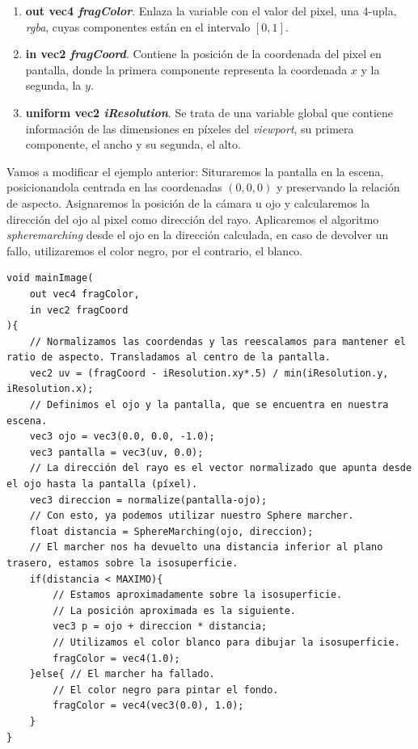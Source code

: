 \begin{enumerate}
    \item \textbf{out vec4 \textit{fragColor}}. Enlaza la variable con el valor del pixel, una 4-upla, \textit{rgba}, cuyas componentes están en el intervalo \([0,1]\).
    \item \textbf{in vec2 \textit{fragCoord}}. Contiene la posición de la coordenada del pixel en pantalla, donde la primera componente representa la coordenada \(x\) y la segunda, la \(y\).
    \item \textbf{uniform vec2 \textit{iResolution}}. Se trata de una variable global que contiene información de las dimensiones en píxeles del \textit{viewport}, su primera componente, el ancho y su segunda, el alto.
\end{enumerate}
Vamos a modificar el ejemplo anterior: Situraremos la pantalla en la escena, posicionandola centrada en las coordenadas \((0,0,0)\) y preservando la relación de aspecto.  Asignaremos la posición de la cámara u ojo y calcularemos la dirección del ojo al pixel como dirección del rayo. Aplicaremos el algoritmo \textit{spheremarching} desde el ojo en la dirección calculada, en caso de devolver un fallo, utilizaremos el color negro, por el contrario, el blanco.
\newpage
\begin{lstlisting}
void mainImage(
    out vec4 fragColor, 
    in vec2 fragCoord
){
    // Normalizamos las coordendas y las reescalamos para mantener el ratio de aspecto. Transladamos al centro de la pantalla.
    vec2 uv = (fragCoord - iResolution.xy*.5) / min(iResolution.y, iResolution.x);
    // Definimos el ojo y la pantalla, que se encuentra en nuestra escena.
    vec3 ojo = vec3(0.0, 0.0, -1.0);
    vec3 pantalla = vec3(uv, 0.0);
    // La dirección del rayo es el vector normalizado que apunta desde el ojo hasta la pantalla (píxel).
    vec3 direccion = normalize(pantalla-ojo);
    // Con esto, ya podemos utilizar nuestro Sphere marcher.
    float distancia = SphereMarching(ojo, direccion);
    // El marcher nos ha devuelto una distancia inferior al plano trasero, estamos sobre la isosuperficie.
    if(distancia < MAXIMO){
        // Estamos aproximadamente sobre la isosuperficie.
        // La posición aproximada es la siguiente.
        vec3 p = ojo + direccion * distancia;
        // Utilizamos el color blanco para dibujar la isosuperficie.
        fragColor = vec4(1.0);
    }else{ // El marcher ha fallado.
        // El color negro para pintar el fondo.
        fragColor = vec4(vec3(0.0), 1.0);
    }
}
\end{lstlisting}
